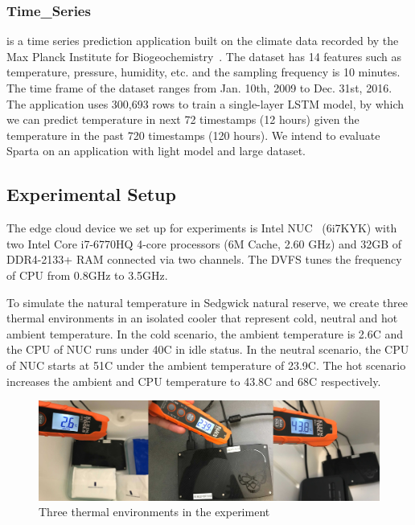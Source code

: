 \subsubsection{Time\_Series} is a time series prediction application built on the climate data recorded by the Max Planck Institute for Biogeochemistry~\cite{ref:jena}. The dataset has 14 features such as temperature, pressure, humidity, etc. and the sampling frequency is 10 minutes. The time frame of the dataset ranges from Jan. 10th, 2009 to Dec. 31st, 2016. The application uses 300,693 rows to train a single-layer LSTM model, by which we can predict temperature in next 72 timestamps (12 hours) given the temperature in the past 720 timestamps (120 hours). We intend to evaluate Sparta on an application with light model and large dataset.


\subsection{Experimental Setup}

The edge cloud device we set up for experiments is Intel NUC~\cite{ref:nuc} (6i7KYK) with two Intel Core i7-6770HQ 4-core processors (6M Cache, 2.60 GHz) and 32GB of DDR4-2133+ RAM connected via two channels. The DVFS tunes the frequency of CPU from 0.8GHz to 3.5GHz.

To simulate the natural temperature in Sedgwick natural reserve, we create three thermal environments in an isolated cooler that represent cold, neutral and hot ambient temperature. In the cold scenario, the ambient temperature is 2.6\degree C and the CPU of NUC runs under 40\degree C in idle status. In the neutral scenario, the CPU of NUC starts at 51\degree C under the ambient temperature of 23.9\degree C. The hot scenario increases the ambient and CPU temperature to 43.8\degree C and 68\degree C respectively.

\begin{figure}
\includegraphics[width=\textwidth]{figures/thermal.jpg}
\caption{Three thermal environments in the experiment} \label{cold}
\end{figure}

